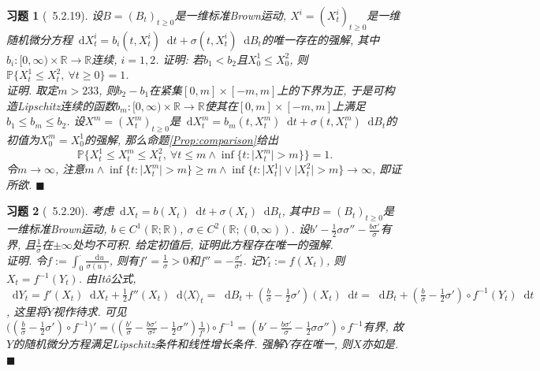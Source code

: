 \documentclass{ctexart}
\theoremstyle{definition}
\theoremstyle{remark}
\theoremstyle{plain}
\newtheorem{Ex}{习题}[section]
\newenvironment{Prf}{\vspace{1ex}\textbf{\\}{\color{red}\textit{证明}}.\normalfont}{\color{red}\hfill$\blacksquare$\vspace{1ex}\par}
\newcommand{\1}{\mathbbm{1}}				%
\renewcommand{\P}{\mathbb{P}}				%
\newcommand{\agp}[1]{\langle #1 \rangle}	%
\newcommand{\abs}[1]{\lvert#1\rvert}			%
\newcommand{\R}{\mathbb{R}}					%
\renewcommand*{\d}{\mathop{}\!\mathrm{d}}	%
\begin{document}
\begin{Ex}[\cite{Karatzas-Shreve--GTM113}~5.2.19]
设$B = (B_{t})_{t \ge 0}$是一维标准Brown运动, $X^{i} = (X^{i}_{t})_{t \ge 0}$是一维随机微分方程$\d X^{i}_{t} = b_{i}(t,X^{i}_{t}) \d t + \sigma(t,X^{i}_{t}) \d B_{t}$的唯一存在的强解, 其中$b_{i} : [0,\infty)\times\R \to \R$连续, $i = 1,2$. 证明: 若$b_{1} < b_{2}$且$X^{1}_{0} \le X^{2}_{0}$, 则$\P\{ X^{1}_{t} \le X^{2}_{t} ,\ \forall t \ge 0 \} = 1$.
\begin{Prf}
取定$m > 233$, 则$b_{2}-b_{1}$在紧集$[0,m]\times[-m,m]$上的下界为正, 于是可构造Lipschitz连续的函数$b_{m} : [0,\infty)\times\R \to \R$使其在$[0,m]\times[-m,m]$上满足$b_{1} \le b_{m} \le b_{2}$. 设$X^{m} = (X^{m}_{t})_{t \ge 0}$是$\d X^{m}_{t} = b_{m}(t,X^{m}_{t}) \d t + \sigma(t,X^{m}_{t}) \d B_{t}$的初值为$X^{m}_{0}=X^{1}_{0}$的强解, 那么命题\ref{Prop:comparison}给出
\[ \P\big\{ X^{1}_{t} \le X^{m}_{t} \le X^{2}_{t} ,\ \forall t \le m \wedge \inf\{ t : \abs{X^{m}_{t}} > m \} \big\} = 1 . \]
令$m \to \infty$, 注意$m \wedge \inf\{ t : \abs{X^{m}_{t}} > m \} \ge m \wedge \inf\{ t : \abs{X^{1}_{t}}\vee\abs{X^{2}_{t}} > m \} \to \infty$, 即证所欲.
\end{Prf}
\end{Ex}


\begin{Ex}[\cite{Karatzas-Shreve--GTM113}~5.2.20]
考虑$\d X_{t} = b(X_{t}) \d t + \sigma(X_{t}) \d B_{t}$, 其中$B = (B_{t})_{t \ge 0}$是一维标准Brown运动, $b \in C^{1}(\R;\R)$, $\sigma \in C^{2}(\R;(0,\infty))$. 设$b'-\frac{1}{2}\sigma\sigma''-\frac{b\sigma'}{\sigma}$有界, 且$\frac{1}{\sigma}$在$\pm\infty$处均不可积. 给定初值后, 证明此方程存在唯一的强解.
\begin{Prf}
令$f := \int_{0}^{\bm{\cdot}} \frac{\d u}{\sigma(u)}$, 则有$f' = \frac{1}{\sigma} > 0$和$f'' = -\frac{\sigma'}{\sigma^2}$. 记$Y_{t} := f(X_{t})$, 则$X_{t} = f^{-1}(Y_{t})$. 由It\^{o}公式, $\d Y_{t} = f'(X_{t}) \d X_{t} + \frac{1}{2}f''(X_{t}) \d\agp{X}_{t} = \d B_{t} + ( \frac{b}{\sigma} - \frac{1}{2} \sigma' )(X_{t}) \d t = \d B_{t} + ( \frac{b}{\sigma} - \frac{1}{2} \sigma' )\circ f^{-1}(Y_{t}) \d t$, 这里将$Y$视作待求. 可见$\big( ( \frac{b}{\sigma} - \frac{1}{2} \sigma' )\circ f^{-1} \big)' = \big(( \frac{b'}{\sigma} - \frac{b\sigma'}{\sigma^2} - \frac{1}{2} \sigma'' )\frac{1}{f'} \big)\circ f^{-1} = ( b' - \frac{b\sigma'}{\sigma} - \frac{1}{2} \sigma\sigma'' )\circ f^{-1}$有界, 故$Y$的随机微分方程满足Lipschitz条件和线性增长条件. 强解$Y$存在唯一, 则$X$亦如是.
\end{Prf}
\end{Ex}
\end{document}
